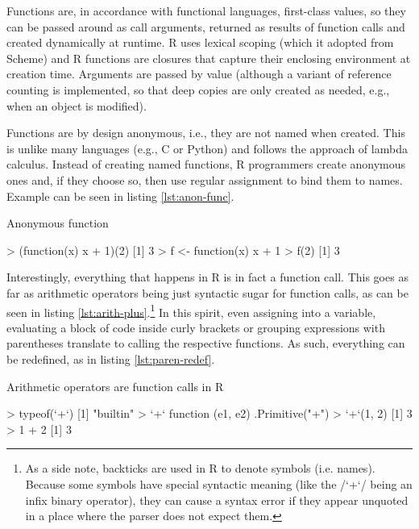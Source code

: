 
Functions are, in accordance with functional languages, first-class values, so they can be passed around as call arguments, returned as results of function calls and created dynamically at runtime. R uses lexical scoping (which it adopted from Scheme) and R functions are closures that capture their enclosing environment at creation time. Arguments are passed by value (although a variant of reference counting is implemented, so that deep copies are only created as needed, e.g., when an object is modified).

Functions are by design anonymous, i.e., they are not named when created. This is unlike many languages (e.g., C or Python) and follows the approach of lambda calculus. Instead of creating named functions, R programmers create anonymous ones and, if they choose so, then use regular assignment to bind them to names. Example can be seen in listing \ref{lst:anon-func}.

\begin{listing}[htbp]
  \caption{\label{lst:anon-func}Anonymous function}
  \begin{rcode}
> (function(x) x + 1)(2)
[1] 3
> f <- function(x) x + 1
> f(2)
[1] 3
  \end{rcode}
\end{listing}

Interestingly, everything that happens in R is in fact a function call. This goes as far as arithmetic operators being just syntactic sugar for function calls, as can be seen in listing \ref{lst:arith-plus}.\footnote{As a side note, backticks are used in R to denote symbols (i.e. names). Because some symbols have special syntactic meaning (like the \rinline/`+`/ being an infix binary operator), they can cause a syntax error if they appear unquoted in a place where the parser does not expect them.} In this spirit, even assigning into a variable, evaluating a block of code inside curly brackets or grouping expressions with parentheses translate to calling the respective functions. As such, everything can be redefined, as in listing \ref{lst:paren-redef}.


\begin{listing}[htbp]
  \caption{\label{lst:arith-plus}Arithmetic operators are function calls in R}
  \begin{rcode}
> typeof(`+`)
[1] "builtin"
> `+`
function (e1, e2)  .Primitive("+")
> `+`(1, 2)
[1] 3
> 1 + 2
[1] 3
  \end{rcode}
\end{listing}

